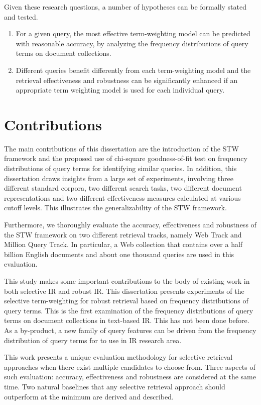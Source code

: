\noindent Given these research questions, a number of hypotheses can be formally stated and tested.

\begin{enumerate}[label=\ac H\arabic*\kapa]
  \item For a given query, the most effective term-weighting model can be predicted with reasonable accuracy, by analyzing the frequency distributions of query terms on document collections.
  \item Different queries benefit differently from each term-weighting model and the retrieval effectiveness and robustness can be significantly enhanced if an appropriate term weighting model is used for each individual query. 
\end{enumerate}

\section{Contributions}

The main contributions of this dissertation are the introduction of the STW framework and the proposed use of chi-square goodness-of-fit test  
on frequency distributions of query terms for identifying similar queries.
In addition, this dissertation draws insights from a large set of experiments, involving three different standard corpora, two different search tasks, two different document representations and two different effectiveness measures calculated at various cutoff levels.
This illustrates the generalizability of the STW framework.

Furthermore, we thoroughly evaluate the accuracy, effectiveness and robustness of the STW framework on two different retrieval tracks, namely Web Track and Million Query Track.
In particular, a Web collection that contains over a half billion English documents and about one thousand queries are used in this evaluation.

This study makes some important contributions to the body of existing work in both selective IR and robust IR. 
This dissertation presents experiments of the selective term-weighting for robust retrieval based on frequency distributions of query terms. 
This is the first examination of the frequency distributions of query terms on document collections in text-based IR. 
This has not been done before. 
As a by-product, a new family of query features can be driven from the frequency distribution of query terms for to use in IR research area.

This work presents a unique evaluation methodology for selective retrieval approaches when there exist multiple candidates to choose from.
Three aspects of such evaluation: accuracy, effectiveness and robustness are considered at the same time.
Two natural baselines that any selective retrieval approach should outperform at the minimum are derived and described.

